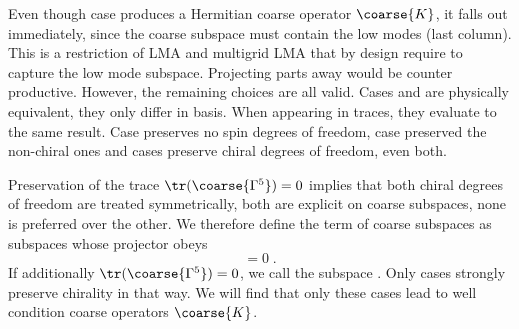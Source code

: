 Even though case  produces a Hermitian coarse operator $\coarse{K}$, it falls out immediately, since the coarse subspace must contain the low modes (last column).
This is a restriction of LMA and multigrid LMA that by design require to capture the low mode subspace.
Projecting parts away would be counter productive.
However, the remaining choices are all valid.
Cases  and  are physically equivalent, they only differ in basis.
When appearing in traces, they evaluate to the same result.
Case  preserves no spin degrees of freedom, case  preserved the non-chiral ones and cases  preserve chiral degrees of freedom,  even both.

Preservation of the trace $\tr(\coarse{\Gamma^5})=0$ implies that both chiral degrees of freedom are treated symmetrically, \ie both are explicit on coarse subspaces, none is preferred over the other.
We therefore define the term  of coarse subspaces as subspaces whose projector obeys
\begin{equation}
[P, \Gamma^{5}] = 0 \;.
\end{equation}
If additionally $\tr(\coarse{\Gamma^5}) = 0$, we call the subspace .
Only cases  strongly preserve chirality in that way.
We will find that only these cases lead to well condition coarse operators $\coarse{K}$.


